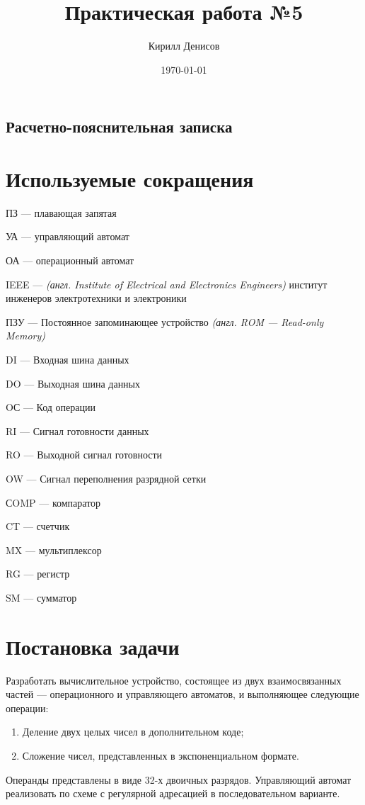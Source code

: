 \documentclass[a4paper,14pt]{extarticle}
\author{Кирилл Денисов}
\title{Практическая работа №5}
\date{\today}
\newcommand{\pathToCommonFolder}{../../Common}
\begin{document}
	\thispagestyle{empty}
	
	
	\newpage
	\tableofcontents
	\newpage
	
\begin{center}
	\section*{Расчетно-пояснительная записка}
\end{center}
\section {Используемые сокращения}
ПЗ --- плавающая запятая

УА --- управляющий автомат

ОА --- операционный автомат

IEEE --- \textit{(англ. Institute of Electrical and Electronics Engineers)} институт инженеров электротехники и электроники

ПЗУ --- Постоянное запоминающее устройство \textit{(англ. ROM --- Read-only Memory)}

DI			---	Входная шина данных

 DO		---	Выходная шина данных
 
 OС		---	Код операции
 
 RI			---	Сигнал готовности данных
 
 RO		---	Выходной сигнал готовности
 

 
 OW		---	Сигнал переполнения разрядной сетки
 
 СOMP		---	компаратор
 
 CT			---	счетчик
 
 MX		---	мультиплексор
 
 RG		---	регистр
 
 
 SM		---	сумматор
\section{Постановка задачи}
Разработать вычислительное устройство, состоящее из  двух взаимосвязанных частей --- операционного и управляющего автоматов, и выполняющее следующие операции:
\begin{enumerate}
	\item Деление двух целых чисел в дополнительном коде;
	\item Сложение чисел, представленных в экспоненциальном формате.
\end{enumerate}
Операнды представлены в виде 32-х двоичных разрядов. Управляющий автомат реализовать по схеме с регулярной адресацией в последовательном варианте.
\end{document}
